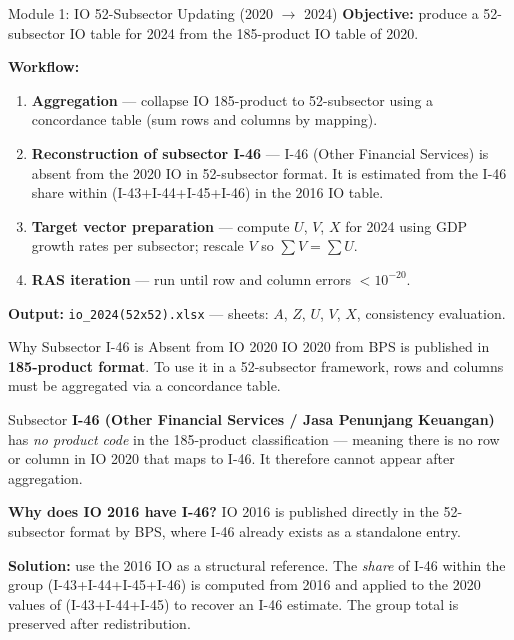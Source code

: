 \documentclass[aspectratio=169]{beamer}
\begin{document}
\begin{frame}{Module 1: IO 52-Subsector Updating (2020 $\to$ 2024)}
\textbf{Objective:} produce a 52-subsector IO table for 2024 from the 185-product IO table of 2020.

\medskip
\textbf{Workflow:}
\begin{enumerate}
  \item \textbf{Aggregation} --- collapse IO 185-product to 52-subsector using a concordance table (sum rows and columns by mapping).
  \item \textbf{Reconstruction of subsector I-46} --- I-46 (Other Financial Services) is absent from the 2020 IO in 52-subsector format. It is estimated from the I-46 share within (I-43+I-44+I-45+I-46) in the 2016 IO table.
  \item \textbf{Target vector preparation} --- compute $U$, $V$, $X$ for 2024 using GDP growth rates per subsector; rescale $V$ so $\sum V = \sum U$.
  \item \textbf{RAS iteration} --- run until row and column errors $< 10^{-20}$.
\end{enumerate}

\medskip
\textbf{Output:} \texttt{io\_2024(52x52).xlsx} --- sheets: $A$, $Z$, $U$, $V$, $X$, consistency evaluation.
\end{frame}

\begin{frame}{Why Subsector I-46 is Absent from IO 2020}
IO 2020 from BPS is published in \textbf{185-product format}. To use it in a 52-subsector framework, rows and columns must be aggregated via a concordance table.

\medskip
Subsector \textbf{I-46 (Other Financial Services / Jasa Penunjang Keuangan)} has \textit{no product code} in the 185-product classification --- meaning there is no row or column in IO 2020 that maps to I-46. It therefore cannot appear after aggregation.

\medskip
\textbf{Why does IO 2016 have I-46?} IO 2016 is published directly in the 52-subsector format by BPS, where I-46 already exists as a standalone entry.

\medskip
\textbf{Solution:} use the 2016 IO as a structural reference. The \textit{share} of I-46 within the group (I-43+I-44+I-45+I-46) is computed from 2016 and applied to the 2020 values of (I-43+I-44+I-45) to recover an I-46 estimate. The group total is preserved after redistribution.
\end{frame}
\end{document}
